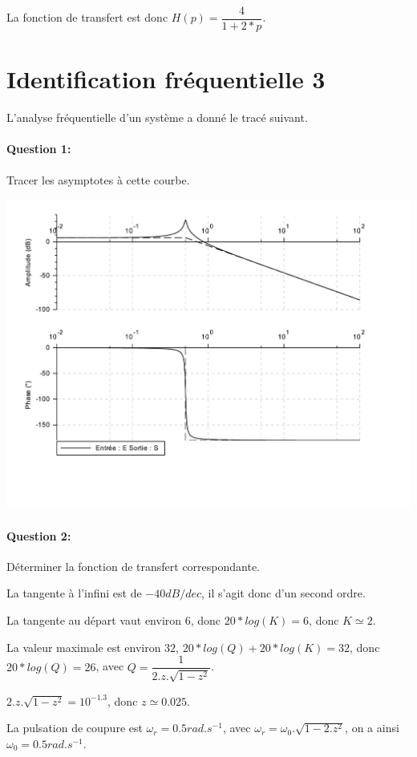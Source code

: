 La fonction de transfert est donc $H(p)=\dfrac{4}{1+2*p}$.

\newpage

\section{Identification fréquentielle 3}

L'analyse fréquentielle d'un système a donné le tracé suivant.

\paragraph{Question 1:} Tracer les asymptotes à cette courbe.

\begin{center}
 \includegraphics[width=0.8\linewidth]{img/Bode3_c}
\end{center} 

\paragraph{Question 2:} Déterminer la fonction de transfert correspondante.

La tangente à l'infini est de $-40dB/dec$, il s'agit donc d'un second ordre.

La tangente au départ vaut environ $6$, donc $20*log(K)=6$, donc $K\simeq 2$.

La valeur maximale est environ $32$, $20*log(Q)+20*log(K)=32$, donc $20*log(Q)=26$, avec $Q=\dfrac{1}{2.z.\sqrt{1-z^2}}$.

$2.z.\sqrt{1-z^2}=10^{-1.3}$, donc $z\simeq 0.025$.

La pulsation de coupure est $\omega_r=0.5rad.s^{-1}$, avec $\omega_r=\omega_0.\sqrt{1-2.z^2}$, on a ainsi $\omega_0=0.5rad.s^{-1}$.

